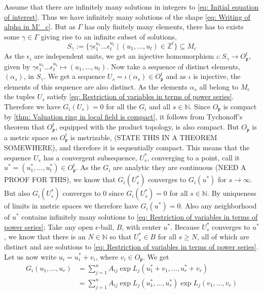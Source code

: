 \documentclass{article}
\newcommand{\mfrak}[1]{\mathfrak{#1}}
\newcommand{\mbb}[1]{\mathbb{#1}}
\begin{document}
Assume that there are infinitely many solutions in integers to \cref{eq: Initial equation of interest}. Thus we have infinitely many solutions of the shape \cref{eq: Writing of alpha in M'_c}. But as $\Gamma$ has only finitely many elements, there has to exists some $\gamma \in \Gamma$ giving rise to an infinite subset of solutions,
$$S_\gamma := \{\gamma \epsilon_1^{u_1} ... \epsilon_t^{u_t} \mid (u_1, ..., u_t) \in \mbb Z^t \} \subseteq M_c$$
As the $\epsilon_i$ are independent units, we get an injective homomorphism $\iota : S_\gamma \to O_\mfrak p^t$, given by $\gamma \epsilon_1^{u_1} ... \epsilon_t^{u_t} \mapsto (u_1, ..., u_t)$. Now take a sequence of distinct elements, $(\alpha_s)$, in $S_\gamma$. We get a sequence $U_s = \iota(\alpha_s) \in O_\mfrak p^t$ and as $\iota$ is injective, the elements of this sequence are also distinct. As the elements $\alpha_s$ all belong to $M_c$ the tuples $U_s$ satisfy \cref{eq: Restriction of variables in terms of power series}. Therefore we have $G_i(U_s) = 0$ for all the $G_i$ and all $s \in \mbb N$. Since $O_\mfrak p$ is compact by \cref{thm: Valuation ring in local field is compact}, it follows from Tychonoff's theorem that $O_\mfrak p^t$, equipped with the product topology, is also compact. But $O_\mfrak p$ is a metric space so $O_\mfrak p^t$ is metrizable, (STATE THIS IN A THEOREM SOMEWHERE), and therefore it is sequentially compact. This means that the sequence $U_s$ has a convergent subsequence, $U^*_s$, converging to a point, call it $u^* = (u_1^*, ..., u_t^*) \in O_{\mfrak p}^t$. As the $G_i$ are analytic they are continuous (NEED A PROOF FOR THIS), we know that $G_i(U^*_s)$ converges to $G_i(u^*)$ for $s \to \infty$. But also $G_i(U^*_s)$ converges to 0 since $G_i(U^*_s) = 0$ for all $s \in \mbb N$. By uniqueness of limits in metric spaces we therefore have $G_i(u^*) = 0$. Also any neighborhood of $u^*$ contains infinitely many solutions to \cref{eq: Restriction of variables in terms of power series}; Take any open $\epsilon$-ball, $B$, with center $u^*$. Because $U^*_s$ converges to $u^*$, we know that there is an $N \in \mbb N$ so that $U^*_s \in B$ for all $s \geq N$, all of which are distinct and are solutions to \cref{eq: Restriction of variables in terms of power series}. Let us now write $u_i = u_i^* + v_i$, where $v_i \in O_\mfrak p$. We get
\begin{align*}
    G_i(u_1, ..., u_r) &= \sum_{j = 1}^n A_{ij} \exp L_j(u_1^* + v_1, ..., u_r^* + v_r) \\ 
    &= \sum_{j = 1}^n A_{ij} \exp L_j(u_1^*, ..., u_r^*) \exp L_j(v_1, ..., v_r)
\end{align*}
\end{document}
